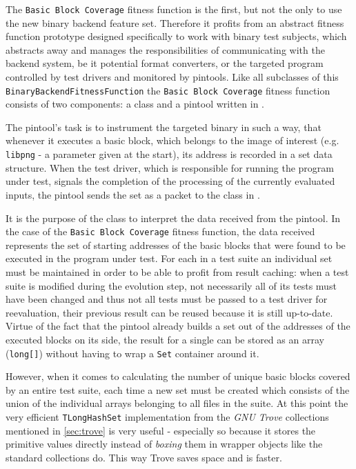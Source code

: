 The \texttt{Basic Block Coverage} fitness function is the first, but not the only to use the new binary 
backend feature set. Therefore it profits from an abstract fitness function prototype designed specifically 
to work with binary test subjects, which abstracts away and manages the responsibilities of communicating 
with the backend system, be it potential format converters, or the targeted program controlled by test 
drivers and monitored by pintools.
Like all subclasses of this \texttt{BinaryBackendFitnessFunction} the \texttt{Basic Block Coverage} 
fitness function consists of two components: a \java class and a pintool written in \cpp.

The pintool's task is to instrument the targeted binary in such a way, that whenever it executes a 
basic block, which belongs to the image of interest (e.g. \texttt{libpng} - a parameter given at the start),
its address is recorded in a set data structure. When the test driver, which is responsible for running 
the program under test, signals the completion of the processing of the currently evaluated inputs, 
the pintool sends the set as a packet to the \java class in \xmlmate.

It is the purpose of the \java class to interpret the data received from the pintool.
In the case of the \texttt{Basic Block Coverage} fitness function, the data received represents the
set of starting addresses of the basic blocks that were found to be executed in the program under test. 
For each \xml in a test suite an individual set must be maintained in order to be able to profit 
from result caching: when a test suite is modified during the evolution step, not necessarily all
of its tests must have been changed and thus not all tests must be passed to a test driver for reevaluation, 
their previous result can be reused because it is still up-to-date. Virtue of the fact that the pintool 
already builds a set out of the addresses of the executed blocks on its side, the result for a single 
\xml can be stored as an array (\texttt{long[]}) without having to wrap a \texttt{Set} container around it.

However, when it comes to calculating the number of unique basic blocks covered by an 
entire test suite, each time a new set must be created which consists of the union of 
the individual arrays belonging to all \xml files in the suite. At this point the very efficient
\texttt{TLongHashSet} implementation from the \emph{GNU Trove} collections mentioned in \cref{sec:trove} 
is very useful - especially so because it stores the \java primitive values directly instead of \emph{boxing}
them in wrapper objects like the standard \java collections do. This way Trove saves space and is faster.

